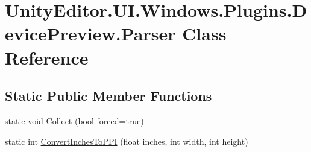 \hypertarget{class_unity_editor_1_1_u_i_1_1_windows_1_1_plugins_1_1_device_preview_1_1_parser}{}\section{Unity\+Editor.\+U\+I.\+Windows.\+Plugins.\+Device\+Preview.\+Parser Class Reference}
\label{class_unity_editor_1_1_u_i_1_1_windows_1_1_plugins_1_1_device_preview_1_1_parser}
\subsection*{Static Public Member Functions}
\begin{DoxyCompactItemize}
\item 
static void \hyperlink{class_unity_editor_1_1_u_i_1_1_windows_1_1_plugins_1_1_device_preview_1_1_parser_a1acd74d9891f131440c093b759025d9c}{Collect} (bool forced=true)
\item 
static int \hyperlink{class_unity_editor_1_1_u_i_1_1_windows_1_1_plugins_1_1_device_preview_1_1_parser_a8d88a903012faff24d1b95f9dee7a435}{Convert\+Inches\+To\+P\+P\+I} (float inches, int width, int height)
\end{DoxyCompactItemize}
